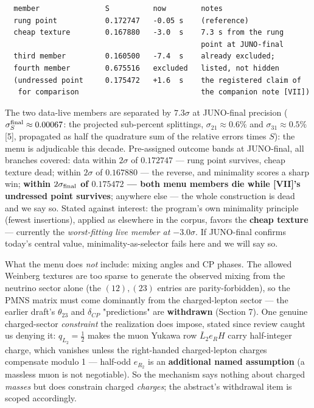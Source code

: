 \documentclass[11pt]{article}
\begin{document}
\begin{small}\begin{verbatim}
  member               S          now        notes
  rung point           0.172747   -0.05 s    (reference)
  cheap texture        0.167880   -3.0  s    7.3 s from the rung
                                             point at JUNO-final
  third member         0.160500   -7.4  s    already excluded;
  fourth member        0.675516   excluded   listed, not hidden
  (undressed point     0.175472   +1.6  s    the registered claim of
   for comparison                            the companion note [VII])
\end{verbatim}\end{small}
The two data-live members are separated by $7.3\sigma$ at JUNO-final precision ($\sigma_S^{\rm final} \approx 0.00067$: the projected sub-percent splittings, $\sigma_{21} \approx 0.6\%$ and $\sigma_{31} \approx 0.5\%$ [5], propagated as half the quadrature sum of the relative errors times $S$): the menu is adjudicable this decade. Pre-assigned outcome bands at JUNO-final, all branches covered: data within $2\sigma$ of $0.172747$ — rung point survives, cheap texture dead; within $2\sigma$ of $0.167880$ — the reverse, and minimality scores a sharp win; \textbf{within $2\sigma_{\rm final}$ of $0.175472$ — both menu members die while [VII]'s undressed point survives}; anywhere else — the whole construction is dead and we say so.  Stated against interest: the program's own minimality principle (fewest insertions), applied as elsewhere in the corpus, favors the \textbf{cheap texture} — currently the \emph{worst-fitting live member at $-3.0\sigma$}.  If JUNO-final confirms today's central value, minimality-as-selector fails here and we will say so.

What the menu does \emph{not} include: mixing angles and CP phases. The allowed Weinberg textures are too sparse to generate the observed mixing from the neutrino sector alone (the $(12), (23)$ entries are parity-forbidden), so the PMNS matrix must come dominantly from the charged-lepton sector — the earlier draft's $\theta_{23}$ and $\delta_{CP}$ "predictions" are \textbf{withdrawn} (Section 7).  One genuine charged-sector \emph{constraint} the realization does impose, stated since review caught us denying it: $q_{L_2} = \tfrac12$ makes the muon Yukawa row $\bar L_2 e_R H$ carry half-integer charge, which vanishes unless the right-handed charged-lepton charges compensate modulo 1 — half-odd $e_{R_2}$ is an \textbf{additional named assumption} (a massless muon is not negotiable).  So the mechanism says nothing about charged \emph{masses} but does constrain charged \emph{charges}; the abstract's withdrawal item is scoped accordingly.
\end{document}

